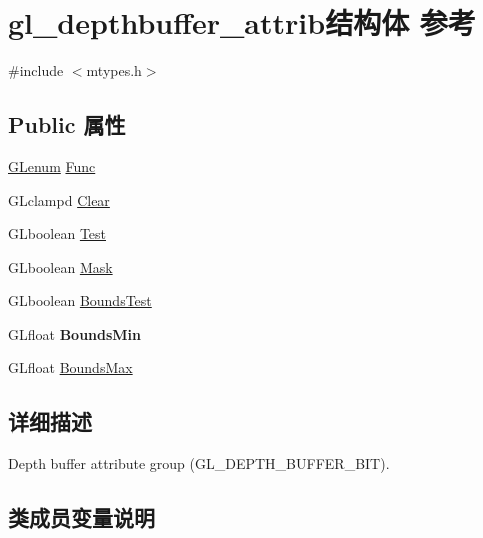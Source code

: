 \hypertarget{structgl__depthbuffer__attrib}{}\section{gl\+\_\+depthbuffer\+\_\+attrib结构体 参考}
\label{structgl__depthbuffer__attrib}


{\ttfamily \#include $<$mtypes.\+h$>$}

\subsection*{Public 属性}
\begin{DoxyCompactItemize}
\item 
\hyperlink{interfacevoid}{G\+Lenum} \hyperlink{structgl__depthbuffer__attrib_ace73d09e38f9324656c134a1b3f3d999}{Func}
\item 
G\+Lclampd \hyperlink{structgl__depthbuffer__attrib_a1ed5d1ccf25baabec597f4d9112ff8b2}{Clear}
\item 
G\+Lboolean \hyperlink{structgl__depthbuffer__attrib_a5dae4c685f4395771db65d9fa8e72434}{Test}
\item 
G\+Lboolean \hyperlink{structgl__depthbuffer__attrib_a764902afcd9f65041dace3922bab3d9f}{Mask}
\item 
G\+Lboolean \hyperlink{structgl__depthbuffer__attrib_a8e92328f44a5f82d60ca3d44008b6a5d}{Bounds\+Test}
\item 
\mbox{\label{structgl__depthbuffer__attrib_ab13117d6621eb9048f5e489b3de56044}} 
G\+Lfloat {\bfseries Bounds\+Min}
\item 
G\+Lfloat \hyperlink{structgl__depthbuffer__attrib_a4f25bde024d92795f021c5cb3262f5f7}{Bounds\+Max}
\end{DoxyCompactItemize}


\subsection{详细描述}
Depth buffer attribute group (G\+L\+\_\+\+D\+E\+P\+T\+H\+\_\+\+B\+U\+F\+F\+E\+R\+\_\+\+B\+IT). 

\subsection{类成员变量说明}
\mbox{\label{structgl__depthbuffer__attrib_a4f25bde024d92795f021c5cb3262f5f7}} 
